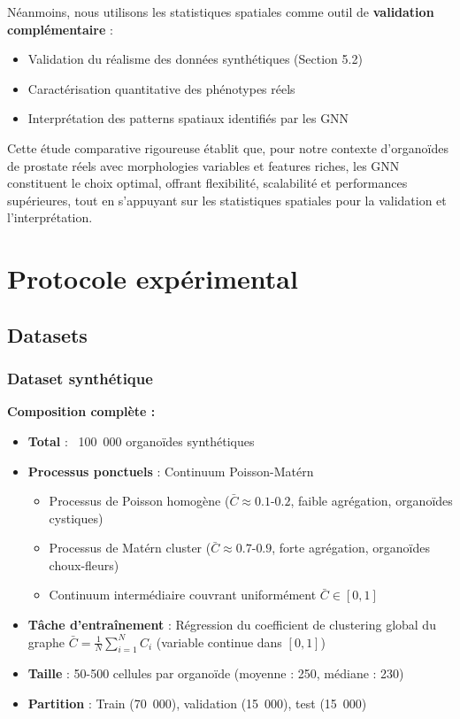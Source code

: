 Néanmoins, nous utilisons les statistiques spatiales comme outil de \textbf{validation complémentaire} :
\begin{itemize}
    \item Validation du réalisme des données synthétiques (Section 5.2)
    \item Caractérisation quantitative des phénotypes réels
    \item Interprétation des patterns spatiaux identifiés par les GNN
\end{itemize}

Cette étude comparative rigoureuse établit que, pour notre contexte d'organoïdes de prostate réels avec morphologies variables et features riches, les GNN constituent le choix optimal, offrant flexibilité, scalabilité et performances supérieures, tout en s'appuyant sur les statistiques spatiales pour la validation et l'interprétation.

\section{Protocole expérimental}

\subsection{Datasets}

\subsubsection{Dataset synthétique}

\textbf{Composition complète :}
\begin{itemize}
    \item \textbf{Total} : ~100~000 organoïdes synthétiques
    \item \textbf{Processus ponctuels} : Continuum Poisson-Matérn
    \begin{itemize}
        \item Processus de Poisson homogène ($\bar{C} \approx 0.1$-$0.2$, faible agrégation, organoïdes cystiques)
        \item Processus de Matérn cluster ($\bar{C} \approx 0.7$-$0.9$, forte agrégation, organoïdes choux-fleurs)
        \item Continuum intermédiaire couvrant uniformément $\bar{C} \in [0, 1]$
    \end{itemize}
    \item \textbf{Tâche d'entraînement} : Régression du coefficient de clustering global du graphe $\bar{C} = \frac{1}{N}\sum_{i=1}^N C_i$ (variable continue dans $[0,1]$)
    \item \textbf{Taille} : 50-500 cellules par organoïde (moyenne : 250, médiane : 230)
    \item \textbf{Partition} : Train (70~000), validation (15~000), test (15~000)
\end{itemize}


